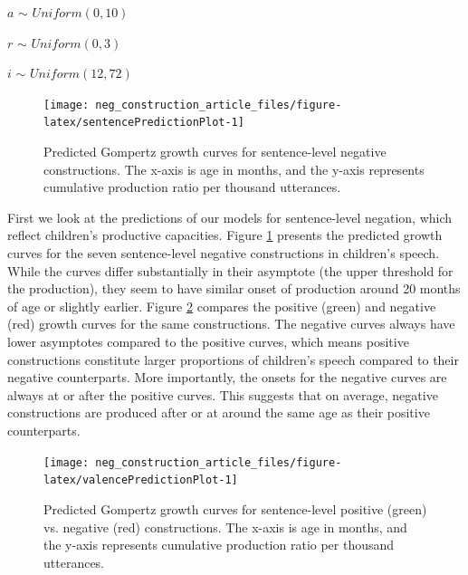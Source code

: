\documentclass[
  man,floatsintext]{apa6}
\begin{document}
\(a\) \(\sim\) \(Uniform(0, 10)\)

\(r\) \(\sim\) \(Uniform(0, 3)\)

\(i\) \(\sim\) \(Uniform(12, 72)\)

\begin{figure}[H]

{\centering \texttt{[image: neg\_construction\_article\_files/figure-latex/sentencePredictionPlot-1]} 

}

\caption{Predicted Gompertz growth curves for sentence-level negative constructions. The x-axis is age in months, and the y-axis represents cumulative production ratio per thousand utterances.}\label{fig:sentencePredictionPlot}
\end{figure}

First we look at the predictions of our models for sentence-level negation, which reflect children's productive capacities. Figure \ref{fig:sentencePredictionPlot} presents the predicted growth curves for the seven sentence-level negative constructions in children's speech. While the curves differ substantially in their asymptote (the upper threshold for the production), they seem to have similar onset of production around 20 months of age or slightly earlier. Figure \ref{fig:valencePredictionPlot} compares the positive (green) and negative (red) growth curves for the same constructions. The negative curves always have lower asymptotes compared to the positive curves, which means positive constructions constitute larger proportions of children's speech compared to their negative counterparts. More importantly, the onsets for the negative curves are always at or after the positive curves. This suggests that on average, negative constructions are produced after or at around the same age as their positive counterparts.

\begin{figure}[H]

{\centering \texttt{[image: neg\_construction\_article\_files/figure-latex/valencePredictionPlot-1]} 

}

\caption{Predicted Gompertz growth curves for sentence-level positive (green) vs. negative (red) constructions. The x-axis is age in months, and the y-axis represents cumulative production ratio per thousand utterances.}\label{fig:valencePredictionPlot}
\end{figure}
\end{document}
